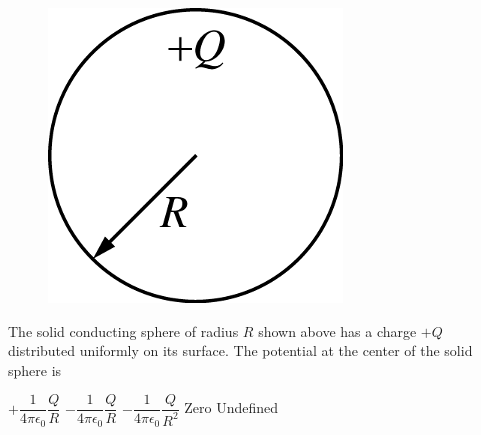 \begin{figure}[H]
    \center
    \includegraphics[scale=0.25]{images/img-010-020.png}
\end{figure}

\begin{questions}\setcounter{question}{27}\question
The solid conducting sphere of radius $R$ shown above has a charge $+Q$ distributed uniformly on its surface. The potential at the center of the solid sphere is

\begin{oneparchoices}
\choice $+\dfrac{1}{4 \pi \epsilon_{0}} \dfrac{Q}{R}$
\choice $-\dfrac{1}{4 \pi \epsilon_{0}} \dfrac{Q}{R}$
\choice $-\dfrac{1}{4 \pi \epsilon_{0}} \dfrac{Q}{R^{2}}$
\choice Zero
\choice Undefined
\end{oneparchoices}\end{questions}

